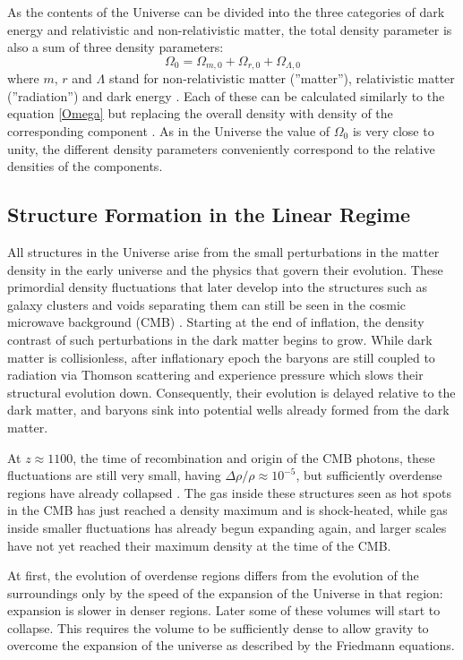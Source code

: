 \documentclass[english, oneside]{HYgradu}
\begin{document}
As the contents of the Universe can be divided into the three categories of dark energy and relativistic and non-relativistic matter, the total density parameter is also a sum of three density parameters:
\begin{equation}
\Omega_0 = \Omega_{m,0} + \Omega_{r, 0} + \Omega_{\Lambda, 0}
\end{equation}
where $m$, $r$ and $\Lambda$ stand for non-relativistic matter (''matter''), relativistic matter (''radiation'') and dark energy \citep{mo2010galaxy}. Each of these can be calculated similarly to the equation \ref{Omega} but replacing the overall density with density of the corresponding component \citep{mo2010galaxy}. As in the Universe the value of $\Omega_0$ is very close to unity, the different density parameters conveniently correspond to the relative densities of the components.


\subsection{Structure Formation in the Linear Regime} \label{universe-structure}
All structures in the Universe arise from the small perturbations in the matter density in the early universe and the physics that govern their evolution. These primordial density fluctuations that later develop into the structures such as galaxy clusters and voids separating them can still be seen in the cosmic microwave background (CMB) \citep{planck2016resultsI}. Starting at the end of inflation, the density contrast of such perturbations in the dark matter begins to grow. While dark matter is collisionless, after inflationary epoch the baryons are still coupled to radiation via Thomson scattering and experience pressure which slows their structural evolution down. Consequently, their evolution is delayed relative to the dark matter, and baryons sink into potential wells already formed from the dark matter.

At $z \approx 1100$, the time of recombination and origin of the CMB photons, these fluctuations are still very small, having $\Delta\rho/\rho \approx 10^{-5}$, but sufficiently overdense regions have already collapsed \citep{mo2010galaxy}. The gas inside these structures seen as hot spots in the CMB has just reached a density maximum and is shock-heated, while gas inside smaller fluctuations has already begun expanding again, and larger scales have not yet reached their maximum density at the time of the CMB.

At first, the evolution of overdense regions differs from the evolution of the surroundings only by the speed of the expansion of the Universe in that region: expansion is slower in denser regions. Later some of these volumes will start to collapse. This requires the volume to be sufficiently dense to allow gravity to overcome the expansion of the universe as described by the Friedmann equations.
\end{document}
